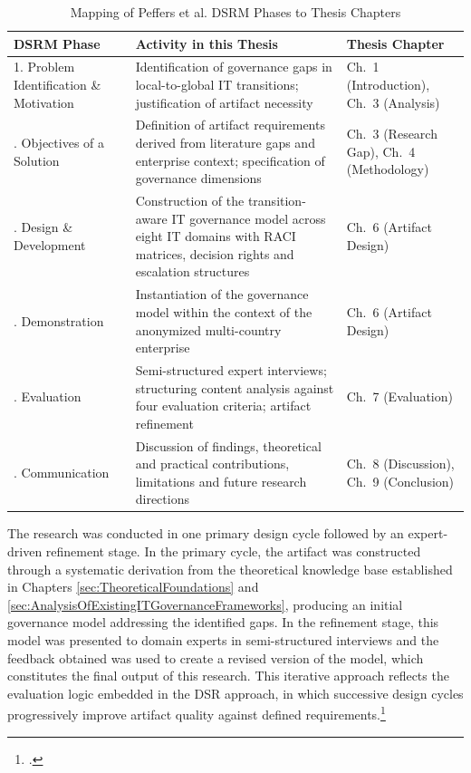 \begin{table}[H]
\centering
\caption{Mapping of Peffers et al. DSRM Phases to Thesis Chapters}
\label{tab:DSRMMapping}
\begin{tabularx}{\textwidth}{p{4cm} p{5.5cm} p{4cm}}
\toprule
\textbf{DSRM Phase} & \textbf{Activity in this Thesis} & \textbf{Thesis Chapter} \\
\midrule
1. Problem Identification \& Motivation
& Identification of governance gaps in local-to-global IT transitions; justification of artifact necessity
& Ch.\ 1 (Introduction), Ch.\ 3 (Analysis) \\
\addlinespace
2. Objectives of a Solution
& Definition of artifact requirements derived from literature gaps and enterprise context; specification of governance dimensions
& Ch.\ 3 (Research Gap), Ch.\ 4 (Methodology) \\
\addlinespace
3. Design \& Development
& Construction of the transition-aware IT governance model across eight IT domains with RACI matrices, decision rights and escalation structures
& Ch.\ 6 (Artifact Design) \\
\addlinespace
4. Demonstration
& Instantiation of the governance model within the context of the anonymized multi-country enterprise
& Ch.\ 6 (Artifact Design) \\
\addlinespace
5. Evaluation
& Semi-structured expert interviews; structuring content analysis against four evaluation criteria; artifact refinement
& Ch.\ 7 (Evaluation) \\
\addlinespace
6. Communication
& Discussion of findings, theoretical and practical contributions, limitations and future research directions
& Ch.\ 8 (Discussion), Ch.\ 9 (Conclusion) \\
\bottomrule
\end{tabularx}
\end{table}

The research was conducted in one primary design cycle followed by an expert-driven refinement stage.
In the primary cycle, the artifact was constructed through a systematic derivation from the theoretical knowledge base established in Chapters \ref{sec:TheoreticalFoundations} and \ref{sec:AnalysisOfExistingITGovernanceFrameworks}, producing an initial governance model addressing the identified gaps.
In the refinement stage, this model was presented to domain experts in semi-structured interviews and the feedback obtained was used to create a revised version of the model, which constitutes the final output of this research.
This iterative approach reflects the evaluation logic embedded in the \ac{DSR} approach, in which successive design cycles progressively improve artifact quality against defined requirements.\footcite[2-4]{bennerwicknerLeitfadenNutzungDesign2020}

